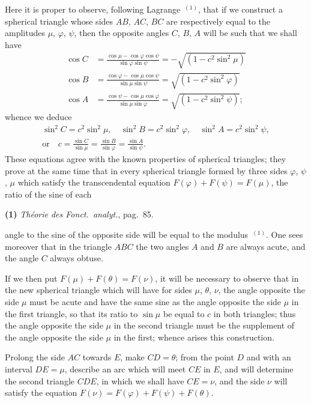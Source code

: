 \documentclass{article}
\begin{document}
Here it is proper to observe, following Lagrange~${}^{(1)}$, that if we construct a spherical triangle whose sides $AB$, $AC$, $BC$ are respectively equal to the amplitudes $\mu$, $\varphi$, $\psi$, then the opposite angles $C$, $B$, $A$ will be such that we shall have
\[ \begin{aligned} \cos C&=\frac{\cos\mu-\cos\varphi\cos\psi}{\sin\varphi\sin\psi}=-\sqrt{(1-c^{2}\sin^{2}\mu)}\\ \cos B&=\frac{\cos\varphi-\cos\mu\cos\psi}{\sin\mu\sin\psi}=\sqrt{(1-c^{2}\sin^{2}\varphi)}\\ \cos A&=\frac{\cos\psi-\cos\mu\cos\varphi}{\sin\mu\sin\varphi}=\sqrt{(1-c^{2}\sin^{2}\psi)}; \end{aligned} \]
whence we deduce
\[ \begin{gathered} \sin^{2}C=c^{2}\sin^{2}\mu,\quad\sin^{2}B=c^{2}\sin^{2}\varphi,\quad\sin^{2}A=c^{2}\sin^{2}\psi,\\ \text{or}\quad c=\frac{\sin C}{\sin\mu}=\frac{\sin B}{\sin\varphi}=\frac{\sin A}{\sin\psi}. \end{gathered} \]
These equations agree with the known properties of spherical triangles; they prove at the same time that in every spherical triangle formed by three sides $\varphi$, $\psi$, $\mu$ which satisfy the transcendental equation $F(\varphi)+F(\psi)=F(\mu)$, the ratio of the sine of each

\textbf{(1)} \emph{Théorie des Fonct.\ analyt.}, pag.\ 85.

angle to the sine of the opposite side will be equal to the modulus~${}^{(1)}$. One sees moreover that in the triangle $ABC$ the two angles $A$ and $B$ are always acute, and the angle $C$ always obtuse.

If we then put $F(\mu)+F(\theta)=F(\nu)$, it will be necessary to observe that in the new spherical triangle which will have for sides $\mu$, $\theta$, $\nu$, the angle opposite the side $\mu$ must be acute and have the same sine as the angle opposite the side $\mu$ in the first triangle, so that its ratio to $\sin\mu$ be equal to $c$ in both triangles; thus the angle opposite the side $\mu$ in the second triangle must be the supplement of the angle opposite the side $\mu$ in the first; whence arises this construction.

Prolong the side $AC$ towards $E$, make $CD=\theta$; from the point $D$ and with an interval $DE=\mu$, describe an arc which will meet $CE$ in $E$, and will determine the second triangle $CDE$, in which we shall have $CE=\nu$, and the side $\nu$ will satisfy the equation $F(\nu)=F(\varphi)+F(\psi)+F(\theta)$.
\end{document}
